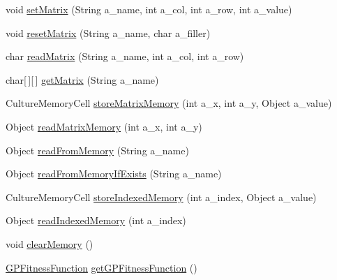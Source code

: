 \begin{DoxyCompactItemize}
\item 
void \hyperlink{classorg_1_1jgap_1_1gp_1_1impl_1_1_g_p_configuration_a947f3e50f45853f645fac7a6c14cd706}{set\-Matrix} (String a\-\_\-name, int a\-\_\-col, int a\-\_\-row, int a\-\_\-value)
\item 
void \hyperlink{classorg_1_1jgap_1_1gp_1_1impl_1_1_g_p_configuration_a06096d1ec0bd3b4cb602302850debc8e}{reset\-Matrix} (String a\-\_\-name, char a\-\_\-filler)
\item 
char \hyperlink{classorg_1_1jgap_1_1gp_1_1impl_1_1_g_p_configuration_a7d3a7af40e269be8e8ac4f8d4614f154}{read\-Matrix} (String a\-\_\-name, int a\-\_\-col, int a\-\_\-row)
\item 
char\mbox{[}$\,$\mbox{]}\mbox{[}$\,$\mbox{]} \hyperlink{classorg_1_1jgap_1_1gp_1_1impl_1_1_g_p_configuration_af4e6f0458a643470e1b476a44ddedb94}{get\-Matrix} (String a\-\_\-name)
\item 
Culture\-Memory\-Cell \hyperlink{classorg_1_1jgap_1_1gp_1_1impl_1_1_g_p_configuration_a4282763442f18b087e358d6f25ed3de8}{store\-Matrix\-Memory} (int a\-\_\-x, int a\-\_\-y, Object a\-\_\-value)
\item 
Object \hyperlink{classorg_1_1jgap_1_1gp_1_1impl_1_1_g_p_configuration_a0a5899635089c235d8851b9b733ec48c}{read\-Matrix\-Memory} (int a\-\_\-x, int a\-\_\-y)
\item 
Object \hyperlink{classorg_1_1jgap_1_1gp_1_1impl_1_1_g_p_configuration_a8aa7fed17f9495f727bafc042ab1a090}{read\-From\-Memory} (String a\-\_\-name)
\item 
Object \hyperlink{classorg_1_1jgap_1_1gp_1_1impl_1_1_g_p_configuration_a551456bc40158502a2fd0efede5c19c1}{read\-From\-Memory\-If\-Exists} (String a\-\_\-name)
\item 
Culture\-Memory\-Cell \hyperlink{classorg_1_1jgap_1_1gp_1_1impl_1_1_g_p_configuration_a5de544f73b760f30047ea00c378754a2}{store\-Indexed\-Memory} (int a\-\_\-index, Object a\-\_\-value)
\item 
Object \hyperlink{classorg_1_1jgap_1_1gp_1_1impl_1_1_g_p_configuration_a3441a2d54454442ba0c88b4cd7dcb89c}{read\-Indexed\-Memory} (int a\-\_\-index)
\item 
void \hyperlink{classorg_1_1jgap_1_1gp_1_1impl_1_1_g_p_configuration_aaab4bf582b4068d9f2210242cb9d00c7}{clear\-Memory} ()
\item 
\hyperlink{classorg_1_1jgap_1_1gp_1_1_g_p_fitness_function}{G\-P\-Fitness\-Function} \hyperlink{classorg_1_1jgap_1_1gp_1_1impl_1_1_g_p_configuration_a6bc78117eacc394fb5a7c86251027367}{get\-G\-P\-Fitness\-Function} ()
\item 

\end{DoxyCompactItemize}
